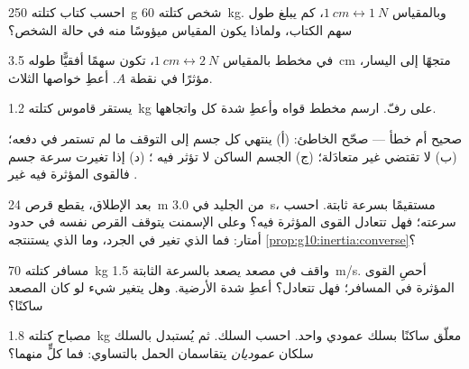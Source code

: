 \begin{exercise}[$\star$]\label{exo:g10:inertia:2}
احسب  كتاب كتلته \qty{250}{g}  شخص كتلته \qty{60}{kg}.
وبالمقياس $\qty{1}{cm} \leftrightarrow \qty{1}{N}$، كم يبلغ
طول سهم الكتاب، ولماذا يكون المقياس ميؤوسًا منه في حالة
الشخص؟
\end{exercise}

\begin{exercise}[$\star$]\label{exo:g10:inertia:3}
في مخطط بالمقياس $\qty{1}{cm} \leftrightarrow \qty{2}{N}$، تكون
 سهمًا أفقيًّا طوله \qty{3.5}{cm} متجهًا إلى اليسار، مؤثرًا
في نقطة $A$. أعطِ خواصها الثلاث.
\end{exercise}

\begin{exercise}[$\star$]\label{exo:g10:inertia:4}
يستقر قاموس كتلته \qty{1.2}{kg} على رفّ. ارسم مخطط
قواه وأعطِ شدة كل  واتجاهها.
\end{exercise}

\begin{exercise}[$\star$]\label{exo:g10:inertia:5}
صحيح أم خطأ --- صحّح الخاطئ: (أ) ينتهي كل جسم إلى
التوقف ما لم تستمر  في دفعه؛ (ب) 
لا تقتضي  غير متعادَلة؛ (ج) الجسم الساكن لا تؤثر فيه
؛ (د) إذا تغيرت سرعة جسم فالقوى المؤثرة فيه غير
.
\end{exercise}

\begin{exercise}[$\star\star$]\label{exo:g10:inertia:6}
بعد الإطلاق، يقطع قرص \qty{24}{m} من الجليد في \qty{3.0}{s}،
مستقيمًا بسرعة ثابتة. احسب سرعته؛ فهل تتعادل القوى المؤثرة
فيه؟ وعلى الإسمنت يتوقف القرص نفسه في حدود أمتار: فما الذي تغير
في الجرد، وما الذي يستنتجه \cref{prop:g10:inertia:converse}؟
\end{exercise}

\begin{exercise}[$\star\star$]\label{exo:g10:inertia:7}
مسافر كتلته \qty{70}{kg} واقف في مصعد يصعد بالسرعة الثابتة
\qty{1.5}{m/s}. أحصِ القوى المؤثرة في المسافر؛ فهل تتعادل؟
أعطِ شدة  الأرضية. وهل يتغير شيء لو كان
المصعد ساكنًا؟
\end{exercise}

\begin{exercise}[$\star\star$]\label{exo:g10:inertia:8}
مصباح كتلته \qty{1.8}{kg} معلّق ساكنًا بسلك عمودي واحد.
احسب  السلك. ثم يُستبدل بالسلك سلكان
\emph{عموديان} يتقاسمان الحمل بالتساوي: فما 
كلٍّ منهما؟
\end{exercise}

